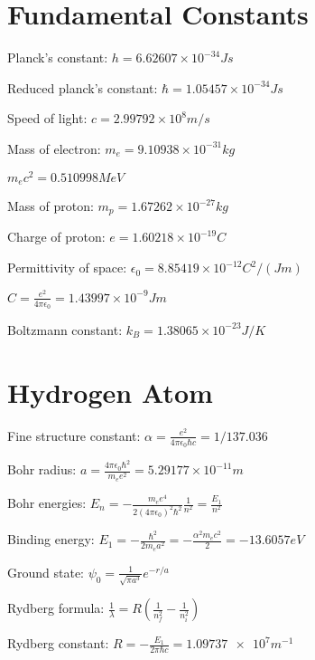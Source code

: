 \documentclass[a4paper]{article}
\begin{document}
\section*{Fundamental Constants}

Planck's constant: $h=6.62607\times10^{-34}\unit{Js}$

Reduced planck's constant: $\hbar=1.05457\times10^{-34}\unit{Js}$

Speed of light: $c=2.99792\times10^8\unit{m/s}$

Mass of electron: $m_e=9.10938\times10^{-31}\unit{kg}$

$m_ec^2=0.510998\unit{MeV}$

Mass of proton: $m_p=1.67262\times10^{-27}\unit{kg}$

Charge of proton: $e=1.60218\times10^{-19}\unit{C}$

Permittivity of space: $\epsilon_0=8.85419\times10^{-12}\unit{C^2/(Jm)}$

$C=\frac{e^2}{4\pi\epsilon_0}=1.43997\times10^{-9}\unit{Jm}$

Boltzmann constant: $k_B=1.38065\times10^{-23}\unit{J/K}$

\section*{Hydrogen Atom}

Fine structure constant: $\alpha=\frac{e^2}{4\pi\epsilon_0\hbar c}=1/137.036$

Bohr radius: $a=\frac{4\pi\epsilon_0\hbar^2}{m_ee^2}=5.29177\times10^{-11}\unit{m}$

Bohr energies: $E_n=-\frac{m_ee^4}{2(4\pi\epsilon_0)^2\hbar^2}\frac{1}{n^2}=\frac{E_1}{n^2}$

Binding energy: $E_1=-\frac{\hbar^2}{2m_ea^2}=-\frac{\alpha^2m_ec^2}{2}=-13.6057\unit{eV}$

Ground state: $\psi_0=\frac{1}{\sqrt{\pi a^3}}e^{-r/a}$

Rydberg formula: $\frac{1}{\lambda}=R(\frac{1}{n_f^2}-\frac{1}{n_i^2})$

Rydberg constant: $R=-\frac{E_1}{2\pi\hbar c}=\num{1.09737e7}\unit{m^{-1}}$
\end{document}
